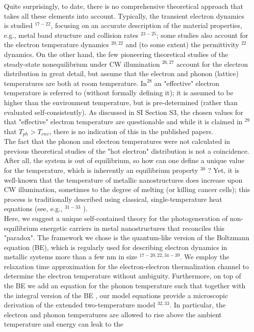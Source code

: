 \documentclass[10pt]{article}
\begin{document}
Quite surprisingly, to date, there is no comprehensive theoretical approach that takes all these elements into account. Typically, the transient electron dynamics is studied ${ }^{17-22}$, focusing on an accurate description of the material properties, e.g., metal band structure and collision rates ${ }^{23-25}$; some studies also account for the electron temperature dynamics ${ }^{20,22}$ and (to some extent) the permittivity ${ }^{22}$ dynamics. On the other hand, the few pioneering theoretical studies of the steady-state nonequilibrium under CW illumination ${ }^{26,27}$ account for the electron distribution in great detail, but assume that the electron and phonon (lattice) temperatures are both at room temperature. $\mathrm{In}^{28}$ an "effective" electron temperature is referred to (without formally defining it); it is assumed to be higher than the environment temperature, but is pre-determined (rather than evaluated self-consistently). As discussed in SI Section S3, the chosen values for that "effective" electron temperature are questionable and while it is claimed in ${ }^{29}$ that $T_{p h}>T_{e n v}$, there is no indication of this in the published papers.\\
The fact that the phonon and electron temperatures were not calculated in previous theoretical studies of the "hot electron" distribution is not a coincidence. After all, the system is out of equilibrium, so how can one define a unique value for the temperature, which is inherently an equilibrium property ${ }^{30}$ ? Yet, it is well-known that the temperature of metallic nanostructures does increase upon CW illumination, sometimes to the degree of melting (or killing cancer cells); this process is traditionally described using classical, single-temperature heat equations (see, e.g., ${ }^{31-33}$ ).\\
Here, we suggest a unique self-contained theory for the photogeneration of non-equilibrium energetic carriers in metal nanostructures that reconciles this "paradox". The framework we chose is the quantum-like version of the Boltzmann equation (BE), which is regularly used for describing electron dynamics in metallic systems more than a few nm in size ${ }^{17-20,22,34-39}$. We employ the relaxation time approximation for the electron-electron thermalization channel to determine the electron temperature without ambiguity. Furthermore, on top of the BE we add an equation for the phonon temperature such that together with the integral version of the BE , our model equations provide a microscopic derivation of the extended two-temperature model ${ }^{32,33}$. In particular, the electron and phonon temperatures are allowed to rise above the ambient temperature and energy can leak to the\\
\end{document}
